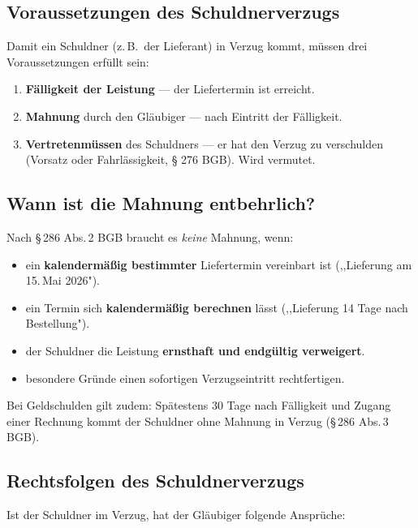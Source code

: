 \documentclass[11pt, a4paper]{article}
\begin{document}
\subsection{Voraussetzungen des Schuldnerverzugs}

Damit ein Schuldner (z.\,B.\ der Lieferant) in Verzug kommt, müssen drei Voraussetzungen
erfüllt sein:

\begin{enumerate}[itemsep=2pt]
  \item \textbf{Fälligkeit der Leistung} --- der Liefertermin ist erreicht.
  \item \textbf{Mahnung} durch den Gläubiger --- nach Eintritt der Fälligkeit.
  \item \textbf{Vertretenmüssen} des Schuldners --- er hat den Verzug zu verschulden (Vorsatz oder Fahrlässigkeit, § 276 BGB). Wird vermutet.
\end{enumerate}

\subsection{Wann ist die Mahnung entbehrlich?}

Nach §\,286 Abs.\,2 BGB braucht es \emph{keine} Mahnung, wenn:

\begin{itemize}[itemsep=2pt]
  \item ein \textbf{kalendermäßig bestimmter} Liefertermin vereinbart ist (,,Lieferung am 15.\,Mai 2026").
  \item ein Termin sich \textbf{kalendermäßig berechnen} lässt (,,Lieferung 14 Tage nach Bestellung").
  \item der Schuldner die Leistung \textbf{ernsthaft und endgültig verweigert}.
  \item besondere Gründe einen sofortigen Verzugseintritt rechtfertigen.
\end{itemize}

\begin{merksatz}[title={Praxisregel}]
Bei Geldschulden gilt zudem: Spätestens 30 Tage nach Fälligkeit und Zugang einer
Rechnung kommt der Schuldner ohne Mahnung in Verzug (§\,286 Abs.\,3 BGB).
\end{merksatz}

\subsection{Rechtsfolgen des Schuldnerverzugs}

Ist der Schuldner im Verzug, hat der Gläubiger folgende Ansprüche:
\end{document}

